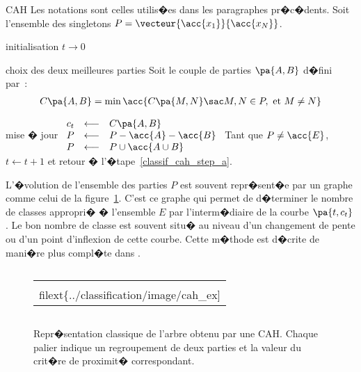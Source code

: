         \begin{xalgorithm}{CAH}
        Les notations sont celles utilis�es dans les paragraphes pr�c�dents. 
        Soit l'ensemble des singletons $P = \vecteur{\acc{x_1}}{\acc{x_N}}$.

        \begin{xalgostep}{initialisation}
        $t \longrightarrow 0$
        \end{xalgostep}

        \begin{xalgostep}{choix des deux meilleures parties}\label{classif_cah_step_a}
        Soit le couple de parties $\pa{A,B}$ d�fini par~:
                $$\begin{array}{l}
                C\pa{A,B} = \min \acc{ C\pa{M,N} \sac M,N \in P, \text{ et } M \neq N }
                \end{array}$$
        \end{xalgostep}

        \begin{xalgostep}{mise � jour}
        $\begin{array}{lll}
        c_t &\longleftarrow& C\pa{A,B} \\
        P     &\longleftarrow& P - \acc{A} -     \acc{B} \\
        P     &\longleftarrow& P \cup \acc{ A \cup B}
        \end{array}$
        Tant que $P \neq \acc{E}$, $t \longleftarrow t+1$ et retour � l'�tape~\ref{classif_cah_step_a}.
        \end{xalgostep}
        
        \end{xalgorithm}

L'�volution de l'ensemble des parties $P$ est souvent repr�sent�e par un graphe comme celui de la figure~\ref{classification_fig_cah}. C'est ce graphe qui permet de d�terminer le nombre de classes appropri� � l'ensemble $E$ par l'interm�diaire de la courbe $\pa{t,c_t}$. Le bon nombre de classe est souvent situ� au niveau d'un changement de pente ou d'un point d'inflexion de cette courbe. Cette m�thode est d�crite de mani�re plus compl�te dans .


        \begin{figure}[ht]
        $$\begin{tabular}{|c|}\hline
        \texttt{[image: \\filext\{../classification/image/cah\_ex]}}
        \\ \hline \end{tabular}$$
        \caption{ Repr�sentation classique de l'arbre obtenu par une CAH. Chaque palier indique un regroupement
                            de deux parties et la valeur du crit�re de proximit� correspondant.}
        \label{classification_fig_cah}
        \end{figure}
        






